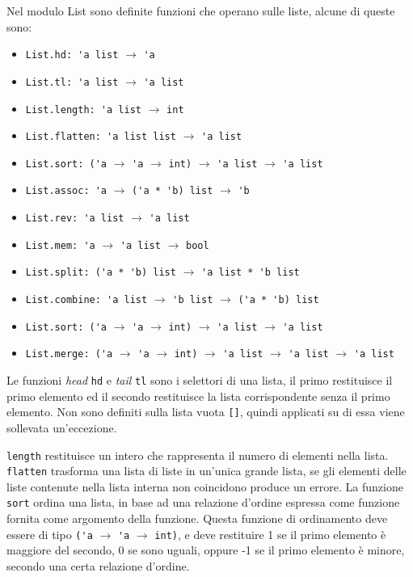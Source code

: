 \documentclass{article}
\numberwithin{equation}{subsection}
\begin{document}
Nel modulo List sono definite funzioni che operano sulle liste, alcune di queste sono:
\begin{itemize}
    \item \verb|List.hd: 'a list| $\rightarrow$ \verb|'a|
    \item \verb|List.tl: 'a list| $\rightarrow$ \verb|'a list|
    \item \verb|List.length: 'a list| $\rightarrow$ \verb|int|
    \item \verb|List.flatten: 'a list list| $\rightarrow$ \verb|'a list|
    \item \verb|List.sort: ('a| $\rightarrow$ \verb|'a| $\rightarrow$ \verb|int)| $\rightarrow$ \verb|'a list| $\rightarrow$ \verb|'a list|
    \item \verb|List.assoc: 'a| $\rightarrow$ \verb|('a * 'b) list| $\rightarrow$ \verb|'b|
    \item \verb|List.rev: 'a list| $\rightarrow$ \verb|'a list|
    \item \verb|List.mem: 'a| $\rightarrow$ \verb|'a list| $\rightarrow$ \verb|bool|
    \item \verb|List.split: ('a * 'b) list| $\rightarrow$ \verb|'a list * 'b list|
    \item \verb|List.combine: 'a list| $\rightarrow$ \verb|'b list| $\rightarrow$ \verb|('a * 'b) list|
    \item \verb|List.sort: ('a| $\rightarrow$ \verb|'a| $\rightarrow$ \verb|int)| $\rightarrow$ \verb|'a list| $\rightarrow$ \verb|'a list|
    \item \verb|List.merge: ('a| $\rightarrow$ \verb|'a| $\rightarrow$ \verb|int)| $\rightarrow$ \verb|'a list| $\rightarrow$ \verb|'a list| $\rightarrow$ \verb|'a list|
\end{itemize}
Le funzioni \textit{head} \verb|hd| e \textit{tail} \verb|tl| sono i selettori di una lista, il primo restituisce il primo elemento ed il secondo restituisce la lista corrispondente senza il primo elemento. Non sono definiti sulla lista vuota \verb|[]|, quindi applicati su di essa viene sollevata un'eccezione.  

\verb|length| restituisce un intero che rappresenta il numero di elementi nella lista. \verb|flatten| trasforma una lista di liste in un'unica grande lista, se gli elementi delle liste contenute nella lista interna non coincidono produce un errore. La funzione \verb|sort| ordina una lista, in base ad una relazione d'ordine espressa come funzione fornita come argomento della funzione. Questa funzione di ordinamento deve essere di tipo \verb|('a| $\rightarrow$ \verb|'a| $\rightarrow$ \verb|int)|, e deve restituire 1 se il primo elemento è maggiore del secondo, 0 se sono uguali, oppure -1 se il primo elemento è minore, secondo una certa relazione d'ordine. 
\end{document}
